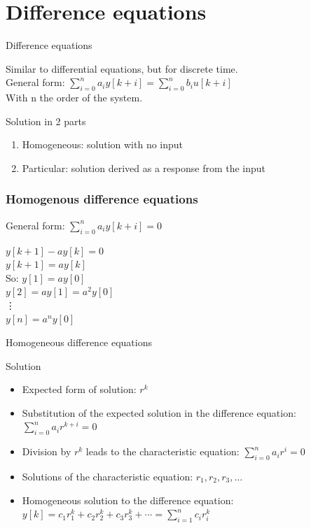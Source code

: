 \section{Difference equations}
\begin{frame}{Difference equations}
	\begin{definition}
		Similar to differential equations, but for discrete time.\\
		General form: $\sum\limits_{i=0}^n a_iy[k+i] = \sum\limits_{i=0}^n b_iu[k+i]$\\
		With n  the order of the system.\\
	\end{definition}
	\begin{block}{Solution in 2 parts}
	\begin{enumerate}
			\item Homogeneous: solution with no input
			\item Particular: solution derived as a response from the input
	\end{enumerate}
	\end{block}
\end{frame}
\begin{frame}
	\frametitle{Homogenous difference equations}
	\begin{definition}
		General form: $\sum\limits_{i=0}^n a_iy[k+i]= 0$ \\
	\end{definition}
	\begin{example}
		\begin{center}
				$y[k+1] - ay[k] = 0$\\
				$y[k+1] = ay[k] $\\
				So:
				$y[1] = ay[0] $\\
				$y[2] = ay[1] = a^2y[0]$\\
				\hspace{1em}\vdots \\
				$y[n] = a^{n}y[0]$
		\end{center}
	
	\end{example}

\end{frame}
\begin{frame}{Homogeneous difference equations}
	\begin{block}{Solution}
		\begin{itemize}
			\item Expected form of solution: $r^{k}$ 
			\item 	Substitution of the expected solution in the difference equation:
			$\sum\limits_{i=0}^n a_ir^{k+i}= 0$
			\item Division by $r^{k}$ leads to the characteristic equation:
			$\sum\limits_{i=0}^n a_ir^{i}= 0$
			\item 	Solutions of the characteristic equation:
			$r_1,r_2,r_3,\dots$
			\item Homogeneous solution to the difference equation: 
			$y[k] = c_1r_1^{k} + c_2r_2^{k} + c_3r_3^{k} + \cdots =\sum\limits_{i=1}^{n}c_ir_i^{k}$
		\end{itemize}
	\end{block}
\end{frame}
